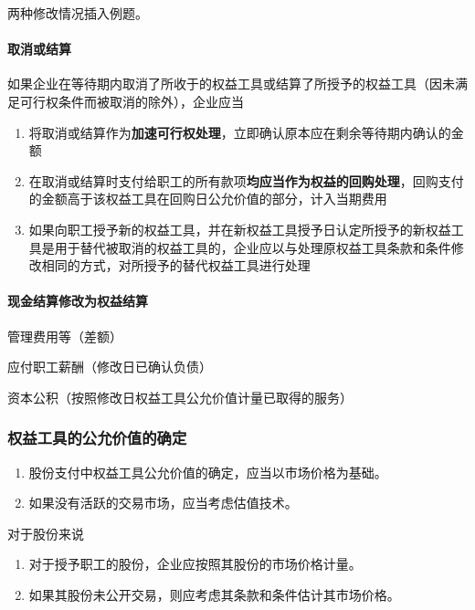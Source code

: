 \documentclass[UTF8,12pt]{ctexart}
\newenvironment{Dr}{%
	\begin{list}{}%
		{
			\setlength{\leftmargin}{2em}
			\setlength{\labelwidth}{2em}
			\setlength{\labelsep}{0pt}
			\setlength{\itemindent}{0pt}
			\setlength{\listparindent}{0pt}
			\setlength{\parsep}{0pt}
			\setlength{\topsep}{0pt}
		}
		\item[\textbf{借：}]
	}{%
	\end{list}
}
\newenvironment{Cr}{%
	\begin{list}{}%
		{
			\setlength{\leftmargin}{3em}
			\setlength{\labelwidth}{2em}
			\setlength{\labelsep}{0pt}
			\setlength{\itemindent}{0pt}
			\setlength{\listparindent}{0pt}
			\setlength{\parsep}{0pt}
			\setlength{\topsep}{0pt}
		}
		\item[\textbf{贷：}]
	}{%
	\end{list}
}
\numberwithin{equation}{section} %
\numberwithin{figure}{section}
\numberwithin{table}{section}
\begin{document}
	两种修改情况插入例题。
	
	\paragraph{取消或结算}
	如果企业在等待期内取消了所收于的权益工具或结算了所授予的权益工具（因未满足可行权条件而被取消的除外），企业应当
	\begin{enumerate}
		\item 将取消或结算作为\textbf{加速可行权处理}，立即确认原本应在剩余等待期内确认的金额
		
		\item 在取消或结算时支付给职工的所有款项\textbf{均应当作为权益的回购处理}，回购支付的金额高于该权益工具在回购日公允价值的部分，计入当期费用
		
		\item 如果向职工授予新的权益工具，并在新权益工具授予日认定所授予的新权益工具是用于替代被取消的权益工具的，企业应以与处理原权益工具条款和条件修改相同的方式，对所授予的替代权益工具进行处理
	\end{enumerate}
	
	\paragraph{现金结算修改为权益结算}
	\begin{Dr}
		管理费用等（差额）
		
		应付职工薪酬（修改日已确认负债）
	\end{Dr}
	\begin{Cr}
		资本公积（按照修改日权益工具公允价值计量已取得的服务）
	\end{Cr}
	
	\subsubsection{权益工具的公允价值的确定}
	\begin{enumerate}
		\item 股份支付中权益工具公允价值的确定，应当以市场价格为基础。
		
		\item 如果没有活跃的交易市场，应当考虑估值技术。
	\end{enumerate}
	
	对于股份来说
	\begin{enumerate}
		\item 对于授予职工的股份，企业应按照其股份的市场价格计量。
		
		\item 如果其股份未公开交易，则应考虑其条款和条件估计其市场价格。
		
	\end{enumerate}
	
\end{document}

